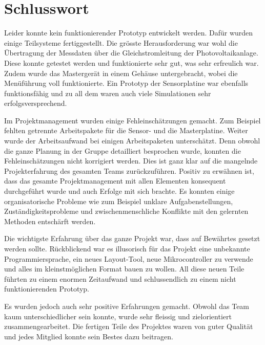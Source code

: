 \chapter{Schlusswort}
\label{chap:schlusswort}

Leider  konnte  kein   funktionierender  Prototyp  entwickelt  werden. Daf\"ur
wurden  einige Teilsysteme  fertiggestellt. Die gr\"osste  Herausforderung war
wohl  die  \"Ubertragung  der  Messdaten  \"uber  die  Gleichstromleitung  der
Photovoltaikanlage. Diese konnte  getestet werden und funktionierte  sehr gut,
was  sehr erfreulich  war. Zudem wurde  das Masterger\"at  in einem  Geh\"ause
untergebracht, wobei die Men\"uf\"uhrung  voll funktionierte. Ein Prototyp der
Sensorplatine war ebenfalls  funktionsf\"ahig und zu all dem  waren auch viele
Simulationen sehr erfolgsversprechend.

Im   Projektmanagement   wurden   einige   Fehleinsch\"atzungen   gemacht. Zum
Beispiel   fehlten  getrennte   Arbeitspakete  f\"ur   die  Sensor-   und  die
Masterplatine. Weiter  wurde  der  Arbeitsaufwand bei  einigen  Arbeitspaketen
untersch\"atzt. Denn  obwohl  die  ganze  Planung in  der  Gruppe  detailliert
besprochen   wurde,   konnten   die  Fehleinsch\"atzungen   nicht   korrigiert
werden. Dies ist  ganz klar  auf die  mangelnde Projekterfahrung  des gesamten
Teams  zur\"uckzuf\"uhren. Positiv   zu  erw\"ahnen  ist,  dass   das  gesamte
Projektmanagement  mit allen  Elementen  konsequent  durchgef\"uhrt wurde  und
auch  Erfolge mit  sich brachte. Es  konnten einige  organisatorische Probleme
wie  zum  Beispiel  unklare Aufgabenstellungen,  Zust\"andigkeitsprobleme  und
zwischenmenschliche Konflikte mit den gelernten Methoden entsch\"arft werden.

Die wichtigste  Erfahrung \"uber das  ganze Projekt war, dass  auf Bew\"ahrtes
gesetzt  werden   sollte.   R\"uckblickend   war  es  illusorisch   f\"ur  das
Projekt  eine  unbekannte  Programmiersprache,  ein  neues  Layout-Tool,  neue
Mikrocontroller zu  verwende und alles  im kleinstm\"oglichen Format  bauen zu
wollen.   All diese  neuen Teile  f\"uhrten zu  einem enormen  Zeitaufwand und
schlussendlich zu einem nicht funktionierenden Prototyp.

Es  wurden jedoch  auch  sehr positive  Erfahrungen  gemacht. Obwohl das  Team
kaum  unterschiedlicher sein  konnte, wurde  sehr fleissig  und zielorientiert
zusammengearbeitet. Die  fertigen   Teile  des   Projektes  waren   von  guter
Qualit\"at und jedes Mitglied konnte sein Bestes dazu beitragen.

